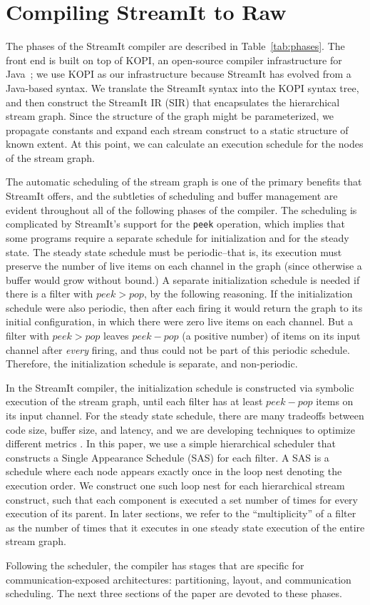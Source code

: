 \section{Compiling StreamIt to Raw}
\label{sec:phases}

The phases of the StreamIt compiler are described in
Table~\ref{tab:phases}.  The front end is built on top of KOPI, an
open-source compiler infrastructure for Java~\cite{kopi}; we use KOPI
as our infrastructure because StreamIt has evolved from a Java-based
syntax.  We translate the StreamIt syntax into the KOPI syntax tree,
and then construct the StreamIt IR (SIR) that encapsulates the
hierarchical stream graph.  Since the structure of the graph might be
parameterized, we propagate constants and expand each stream construct
to a static structure of known extent.  At this point, we can
calculate an execution schedule for the nodes of the stream graph.

The automatic scheduling of the stream graph is one of the primary
benefits that StreamIt offers, and the subtleties of scheduling and
buffer management are evident throughout all of the following phases
of the compiler.  The scheduling is complicated by StreamIt's support
for the {\tt peek} operation, which implies that some programs require
a separate schedule for initialization and for the steady state.  The
steady state schedule must be periodic--that is, its execution must
preserve the number of live items on each channel in the graph (since
otherwise a buffer would grow without bound.)  A separate
initialization schedule is needed if there is a filter with $peek >
pop$, by the following reasoning.  If the initialization schedule were
also periodic, then after each firing it would return the graph to its
initial configuration, in which there were zero live items on each
channel.  But a filter with $peek > pop$ leaves $peek-pop$ (a positive
number) of items on its input channel after {\it every} firing, and
thus could not be part of this periodic schedule.  Therefore, the
initialization schedule is separate, and non-periodic.

In the StreamIt compiler, the initialization schedule is constructed
via symbolic execution of the stream graph, until each filter has at
least $peek-pop$ items on its input channel.  For the steady state
schedule, there are many tradeoffs between code size, buffer size, and
latency, and we are developing techniques to optimize different
metrics \cite{streamittech2}.  In this paper, we use a simple
hierarchical scheduler that constructs a Single Appearance Schedule
(SAS) \cite{leesdf} for each filter.  A SAS is a schedule where each
node appears exactly once in the loop nest denoting the execution
order.  We construct one such loop nest for each hierarchical stream
construct, such that each component is executed a set number of times
for every execution of its parent.  In later sections, we refer to the
``multiplicity'' of a filter as the number of times that it executes
in one steady state execution of the entire stream graph.

Following the scheduler, the compiler has stages that are specific for
communication-exposed architectures: partitioning, layout, and
communication scheduling.  The next three sections of the paper are
devoted to these phases.